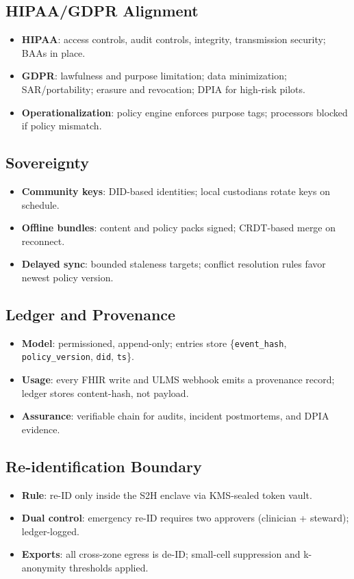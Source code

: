 \documentclass[11pt]{article}
\theoremstyle{plain}
\begin{document}
\subsection{HIPAA/GDPR Alignment}
\begin{itemize}
  \item \textbf{HIPAA}: access controls, audit controls, integrity, transmission security; BAAs in place.
  \item \textbf{GDPR}: lawfulness and purpose limitation; data minimization; SAR/portability; erasure and revocation; DPIA for high-risk pilots.
  \item \textbf{Operationalization}: policy engine enforces purpose tags; processors blocked if policy mismatch.
\end{itemize}

\subsection{Sovereignty}
\begin{itemize}
  \item \textbf{Community keys}: DID-based identities; local custodians rotate keys on schedule.
  \item \textbf{Offline bundles}: content and policy packs signed; CRDT-based merge on reconnect.
  \item \textbf{Delayed sync}: bounded staleness targets; conflict resolution rules favor newest policy version.
\end{itemize}

\subsection{Ledger and Provenance}
\begin{itemize}
  \item \textbf{Model}: permissioned, append-only; entries store \{\texttt{event\_hash}, \texttt{policy\_version}, \texttt{did}, \texttt{ts}\}.
  \item \textbf{Usage}: every FHIR write and ULMS webhook emits a provenance record; ledger stores content-hash, not payload.
  \item \textbf{Assurance}: verifiable chain for audits, incident postmortems, and DPIA evidence.
\end{itemize}

\subsection{Re-identification Boundary}
\begin{itemize}
  \item \textbf{Rule}: re-ID only inside the S2H enclave via KMS-sealed token vault.
  \item \textbf{Dual control}: emergency re-ID requires two approvers (clinician + steward); ledger-logged.
  \item \textbf{Exports}: all cross-zone egress is de-ID; small-cell suppression and k-anonymity thresholds applied.
\end{itemize}
\end{document}
